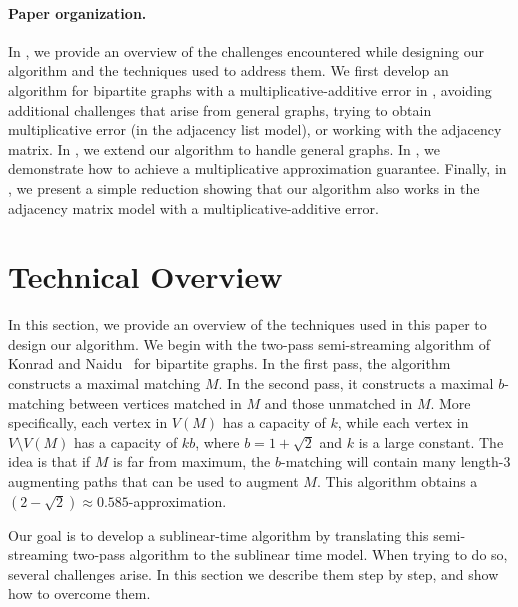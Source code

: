 \documentclass[letterpaper,11pt]{article}
\begin{document}
\paragraph{Paper organization.} In , we provide an overview of the challenges encountered while designing our algorithm and the techniques used to address them. We first develop an algorithm for bipartite graphs with a multiplicative-additive error in , avoiding additional challenges that arise from general graphs, trying to obtain multiplicative error (in the adjacency list model), or working with the adjacency matrix. In , we extend our algorithm to handle general graphs. In , we demonstrate how to achieve a multiplicative approximation guarantee. Finally, in , we present a simple reduction showing that our algorithm also works in the adjacency matrix model with a multiplicative-additive error.











\section{Technical Overview}\label{sec:overview}


In this section, we provide an overview of the techniques used in this paper to design our algorithm. We begin with the two-pass semi-streaming algorithm of Konrad and Naidu~\cite{KonradN21} for bipartite graphs. In the first pass, the algorithm constructs a maximal matching $M$. In the second pass, it constructs a maximal $b$-matching between vertices matched in $M$ and those unmatched in $M$. More specifically, each vertex in $V(M)$ has a capacity of $k$, while each vertex in $V \setminus V(M)$ has a capacity of $kb$, where $b = 1 + \sqrt{2}$ and $k$ is a large constant.
The idea is that if $M$ is far from maximum, the $b$-matching will contain many length-3 augmenting paths that can be used to augment $M$.
This algorithm obtains a $(2 - \sqrt{2}) \approx 0.585$-approximation.

Our goal is to develop a sublinear-time algorithm by translating this semi-streaming two-pass algorithm to the sublinear time model.
When trying to do so, several challenges arise.
In this section we describe them step by step, and show how to overcome them.
\end{document}
